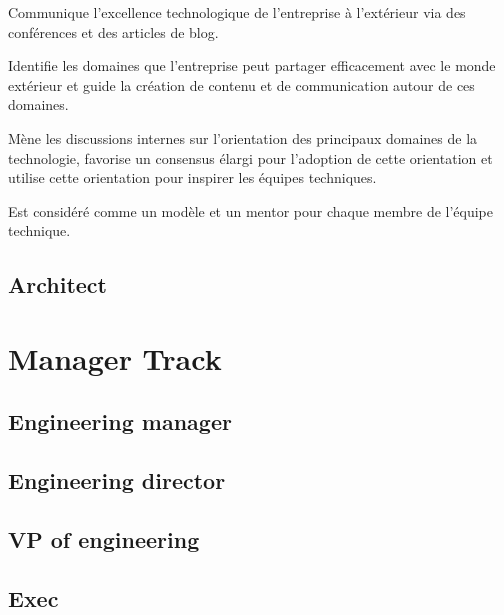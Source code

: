 \documentclass[a4paper, french, openany, 12pt]{book}
\begin{document}
Communique l'excellence technologique de l'entreprise à l'extérieur via des conférences et des articles de blog. 

Identifie les domaines que l'entreprise peut partager efficacement avec le monde extérieur et guide la création de 
contenu et de communication autour de ces domaines.

Mène les discussions internes sur l'orientation des principaux domaines de la technologie, favorise un consensus élargi
pour l'adoption de cette orientation et utilise cette orientation pour inspirer les équipes techniques.

Est considéré comme un modèle et un mentor pour chaque membre de l'équipe technique.

\chapter{Architect}

\part{Manager Track}

\chapter{Engineering manager}

\chapter{Engineering director}

\chapter{VP of engineering}

\chapter{Exec}

\backmatter

\tableofcontents
\end{document}
